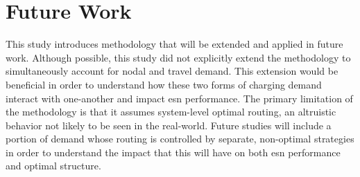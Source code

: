 \section{Future Work}

This study introduces methodology that will be extended and applied in future work. Although possible, this study did not explicitly extend the methodology to simultaneously account for nodal and travel demand. This extension would be beneficial in order to understand how these two forms of charging demand interact with one-another and impact \gls{esn} performance. The primary limitation of the methodology is that it assumes system-level optimal routing, an altruistic behavior not likely to be seen in the real-world. Future studies will include a portion of demand whose routing is controlled by separate, non-optimal strategies in order to understand the impact that this will have on both \gls{esn} performance and optimal structure. 